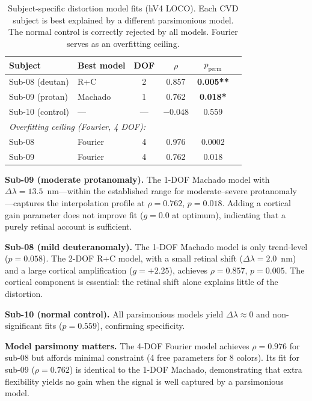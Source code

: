 \documentclass{article}
\begin{document}
\begin{table}[t]
  \caption{Subject-specific distortion model fits (hV4 LOCO). Each CVD subject is best explained by a different parsimonious model. The normal control is correctly rejected by all models. Fourier serves as an overfitting ceiling.}
  \label{tab:main}
  \begin{center}
    \begin{small}
      \begin{tabular}{llcccc}
        \toprule
        Subject & Best model & DOF & $\rho$ & $p_{\text{perm}}$ \\
        \midrule
        Sub-08 (deutan) & R+C & 2 & 0.857 & \textbf{0.005**} \\
        Sub-09 (protan) & Machado & 1 & 0.762 & \textbf{0.018*} \\
        Sub-10 (control) & --- & --- & $-0.048$ & 0.559 \\
        \midrule
        \multicolumn{5}{l}{\emph{Overfitting ceiling (Fourier, 4 DOF):}} \\
        Sub-08 & Fourier & 4 & 0.976 & 0.0002 \\
        Sub-09 & Fourier & 4 & 0.762 & 0.018 \\
        \bottomrule
      \end{tabular}
    \end{small}
  \end{center}
  \vskip -0.15in
\end{table}

\textbf{Sub-09 (moderate protanomaly).}
The 1-DOF Machado model with $\Delta\lambda = 13.5$~nm---within the established range for moderate--severe protanomaly \cite{placeholder_machado2009}---captures the interpolation profile at $\rho = 0.762$, $p = 0.018$.
Adding a cortical gain parameter does not improve fit ($g = 0.0$ at optimum), indicating that a purely retinal account is sufficient.

\textbf{Sub-08 (mild deuteranomaly).}
The 1-DOF Machado model is only trend-level ($p = 0.058$).
The 2-DOF R+C model, with a small retinal shift ($\Delta\lambda = 2.0$~nm) and a large cortical amplification ($g = +2.25$), achieves $\rho = 0.857$, $p = 0.005$.
The cortical component is essential: the retinal shift alone explains little of the distortion.

\textbf{Sub-10 (normal control).}
All parsimonious models yield $\Delta\lambda \approx 0$ and non-significant fits ($p = 0.559$), confirming specificity.

\textbf{Model parsimony matters.}
The 4-DOF Fourier model achieves $\rho = 0.976$ for sub-08 but affords minimal constraint (4 free parameters for 8 colors).
Its fit for sub-09 ($\rho = 0.762$) is identical to the 1-DOF Machado, demonstrating that extra flexibility yields no gain when the signal is well captured by a parsimonious model.
\end{document}
